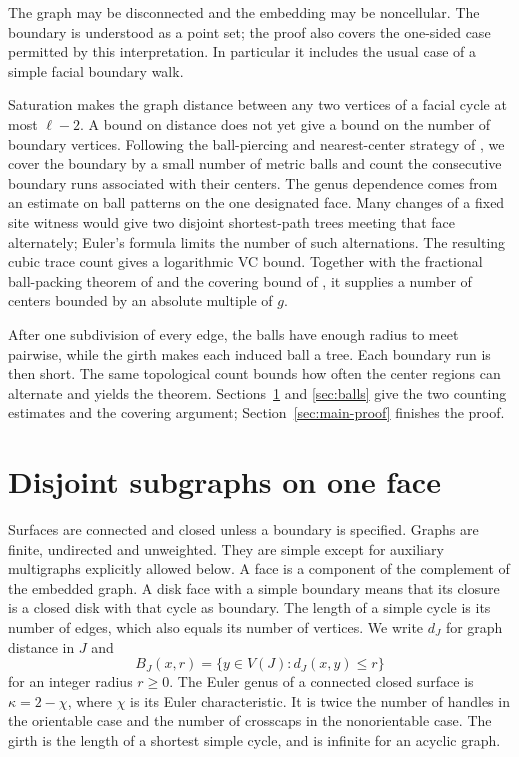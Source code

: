 \documentclass[11pt]{article}
\theoremstyle{remark}
\begin{document}
The graph may be disconnected and the embedding may be noncellular.
The boundary is understood as a point set; the proof also covers the
one-sided case permitted by this interpretation. In particular it
includes the usual case of a simple facial boundary walk.

Saturation makes the graph distance between any two vertices of a
facial cycle at most $\ell-2$. A bound on distance does not yet give a
bound on the number of boundary vertices. Following the ball-piercing
and nearest-center strategy of \cite[Section~4]{PalvolgyiZolomy}, we
cover the boundary by a small number of metric balls and count the
consecutive boundary runs associated with their centers.
The genus dependence comes from an estimate on ball patterns on the
one designated face. Many changes of a fixed site witness would give
two disjoint shortest-path trees meeting that face alternately; Euler's
formula limits the number of such alternations. The resulting cubic
trace count gives a logarithmic VC bound. Together with the fractional
ball-packing theorem of \cite{Bousquet} and the covering bound of
\cite{DSW}, it supplies a number of centers bounded by an absolute
multiple of $g$.

After one subdivision of every edge, the balls have enough radius to
meet pairwise, while the girth makes each induced ball a tree.
Each boundary run is then short. The same topological count bounds
how often the center regions can alternate and yields the theorem.
Sections~\ref{sec:topology} and \ref{sec:balls} give the two counting
estimates and the covering argument; Section~\ref{sec:main-proof}
finishes the proof.

\section{Disjoint subgraphs on one face}\label{sec:topology}

Surfaces are connected and closed unless a boundary is specified.
Graphs are finite, undirected and unweighted. They are simple except for
auxiliary multigraphs explicitly allowed below. A face is a component of
the complement of the embedded graph. A disk face with a simple boundary
means that its closure is a closed disk with that cycle as boundary.
The length of a simple cycle is its
number of edges, which also equals its number of vertices. We write $d_J$
for graph distance in $J$ and
\[
B_J(x,r)=\{y\in V(J):d_J(x,y)\le r\}
\]
for an integer radius $r\ge0$. The Euler genus of a connected closed surface
is $\kappa=2-\chi$, where $\chi$ is its Euler characteristic. It is twice the
number of handles in the orientable case and the number of crosscaps in the
nonorientable case.
The girth is the length of a shortest simple cycle, and is infinite for
an acyclic graph.
\end{document}
